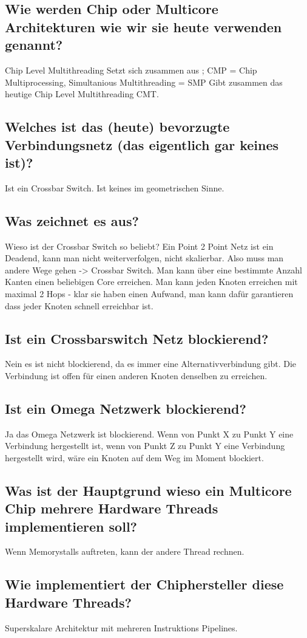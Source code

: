 \subsection{Wie werden Chip oder Multicore Architekturen wie wir sie heute verwenden genannt?}
Chip Level Multithreading
Setzt sich zusammen aus ; CMP = Chip Multiprocessing, Simultanious Multithreading = SMP 
Gibt zusammen das heutige Chip Level Multithreading CMT.
\subsection{Welches ist das (heute) bevorzugte Verbindungsnetz (das eigentlich gar keines ist)?}
Ist ein Crossbar Switch. Ist keines im geometrischen Sinne.
\subsection{Was zeichnet es aus?}
Wieso ist der Crossbar Switch so beliebt?
Ein Point 2 Point Netz ist ein Deadend, kann man nicht weiterverfolgen, nicht skalierbar. Also muss man andere Wege gehen -> Crossbar Switch.
Man kann über eine bestimmte Anzahl Kanten einen beliebigen Core erreichen.
Man kann jeden Knoten erreichen mit maximal 2 Hops - klar sie haben einen Aufwand, 
man kann dafür garantieren dass jeder Knoten schnell erreichbar ist.
\subsection{Ist ein Crossbarswitch Netz blockierend?}
Nein es ist nicht blockierend, da es immer eine Alternativverbindung gibt. Die Verbindung ist offen für einen anderen Knoten denselben zu erreichen.
\subsection{Ist ein Omega Netzwerk blockierend?}
Ja das Omega Netzwerk ist blockierend. Wenn von Punkt X zu Punkt Y eine Verbindung hergestellt ist, wenn von Punkt Z zu Punkt Y eine Verbindung hergestellt wird, wäre ein Knoten auf dem Weg im Moment blockiert.
\subsection{Was ist der Hauptgrund wieso ein Multicore Chip mehrere Hardware Threads implementieren soll?}
Wenn Memorystalls auftreten, kann der andere Thread rechnen.
\subsection{Wie implementiert der Chiphersteller diese Hardware Threads?}
Superskalare Architektur mit mehreren Instruktions Pipelines.
